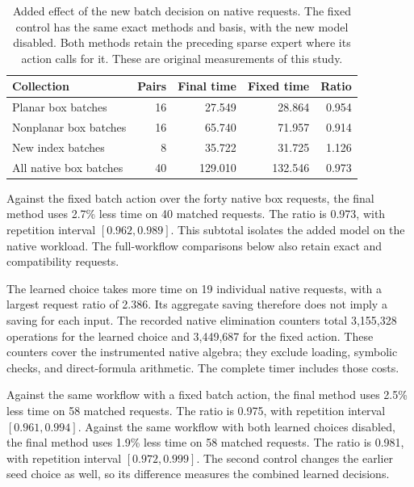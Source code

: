 \begin{table}[!htbp]\centering\small
\caption{Added effect of the new batch decision on native requests. The fixed control has the same exact methods and basis, with the new model disabled. Both methods retain the preceding sparse expert where its action calls for it. These are original measurements of this study.}
\label{tab:analytic-batch-ml}
\begin{tabularx}{\linewidth}{@{}Yrrrr@{}}\toprule
Collection & Pairs & Final time & Fixed time & Ratio\\\midrule
Planar box batches & 16 & 27.549 & 28.864 & 0.954 \\
Nonplanar box batches & 16 & 65.740 & 71.957 & 0.914 \\
New index batches & 8 & 35.722 & 31.725 & 1.126 \\
All native box batches & 40 & 129.010 & 132.546 & 0.973 \\
\bottomrule\end{tabularx}\end{table}

Against the fixed batch action over the forty native box requests, the final method uses 2.7\% less time on 40 matched requests. The ratio is 0.973, with repetition interval $[0.962,0.989]$. This subtotal isolates the added model on the native workload. The full-workflow comparisons below also retain exact and compatibility requests.

The learned choice takes more time on 19 individual native requests, with a largest request ratio of 2.386. Its aggregate saving therefore does not imply a saving for each input. The recorded native elimination counters total 3,155,328 operations for the learned choice and 3,449,687 for the fixed action. These counters cover the instrumented native algebra; they exclude loading, symbolic checks, and direct-formula arithmetic. The complete timer includes those costs.

Against the same workflow with a fixed batch action, the final method uses 2.5\% less time on 58 matched requests. The ratio is 0.975, with repetition interval $[0.961,0.994]$. Against the same workflow with both learned choices disabled, the final method uses 1.9\% less time on 58 matched requests. The ratio is 0.981, with repetition interval $[0.972,0.999]$. The second control changes the earlier seed choice as well, so its difference measures the combined learned decisions.

